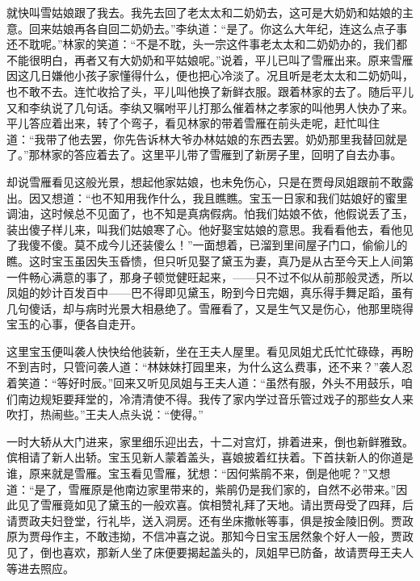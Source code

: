 \begin{parag}
就快叫雪姑娘跟了我去。我先去回了老太太和二奶奶去，这可是大奶奶和姑娘的主意。回来姑娘再各自回二奶奶去。”李纨道：“是了。你这么大年纪，连这么点子事还不耽呢。”林家的笑道：“不是不耽，头一宗这件事老太太和二奶奶办的，我们都不能很明白，再者又有大奶奶和平姑娘呢。”说着，平儿已叫了雪雁出来。原来雪雁因这几日嫌他小孩子家懂得什么，便也把心冷淡了。况且听是老太太和二奶奶叫，也不敢不去。连忙收拾了头，平儿叫他换了新鲜衣服。跟着林家的去了。随后平儿又和李纨说了几句话。李纨又嘱咐平儿打那么催着林之孝家的叫他男人快办了来。平儿答应着出来，转了个弯子，看见林家的带着雪雁在前头走呢，赶忙叫住道：“我带了他去罢，你先告诉林大爷办林姑娘的东西去罢。奶奶那里我替回就是了。”那林家的答应着去了。这里平儿带了雪雁到了新房子里，回明了自去办事。
\end{parag}


\begin{parag}
    却说雪雁看见这般光景，想起他家姑娘，也未免伤心，只是在贾母凤姐跟前不敢露出。因又想道：“也不知用我作什么，我且瞧瞧。宝玉一日家和我们姑娘好的蜜里调油，这时候总不见面了，也不知是真病假病。怕我们姑娘不依，他假说丢了玉，装出傻子样儿来，叫我们姑娘寒了心。他好娶宝姑娘的意思。我看看他去，看他见了我傻不傻。莫不成今儿还装傻么！”一面想着，已溜到里间屋子门口，偷偷儿的瞧。这时宝玉虽因失玉昏愦，但只听见娶了黛玉为妻，真乃是从古至今天上人间第一件畅心满意的事了，那身子顿觉健旺起来，——只不过不似从前那般灵透，所以凤姐的妙计百发百中——巴不得即见黛玉，盼到今日完姻，真乐得手舞足蹈，虽有几句傻话，却与病时光景大相悬绝了。雪雁看了，又是生气又是伤心，他那里晓得宝玉的心事，便各自走开。
\end{parag}


\begin{parag}
    这里宝玉便叫袭人快快给他装新，坐在王夫人屋里。看见凤姐尤氏忙忙碌碌，再盼不到吉时，只管问袭人道：“林妹妹打园里来，为什么这么费事，还不来？”袭人忍着笑道：“等好时辰。”回来又听见凤姐与王夫人道：“虽然有服，外头不用鼓乐，咱们南边规矩要拜堂的，冷清清使不得。我传了家内学过音乐管过戏子的那些女人来吹打，热闹些。”王夫人点头说：“使得。”
\end{parag}


\begin{parag}
    一时大轿从大门进来，家里细乐迎出去，十二对宫灯，排着进来，倒也新鲜雅致。傧相请了新人出轿。宝玉见新人蒙着盖头，喜娘披着红扶着。下首扶新人的你道是谁，原来就是雪雁。宝玉看见雪雁，犹想：“因何紫鹃不来，倒是他呢？”又想道：“是了，雪雁原是他南边家里带来的，紫鹃仍是我们家的，自然不必带来。”因此见了雪雁竟如见了黛玉的一般欢喜。傧相赞礼拜了天地。请出贾母受了四拜，后请贾政夫妇登堂，行礼毕，送入洞房。还有坐床撒帐等事，俱是按金陵旧例。贾政原为贾母作主，不敢违拗，不信冲喜之说。那知今日宝玉居然象个好人一般，贾政见了，倒也喜欢，那新人坐了床便要揭起盖头的，凤姐早已防备，故请贾母王夫人等进去照应。
\end{parag}


